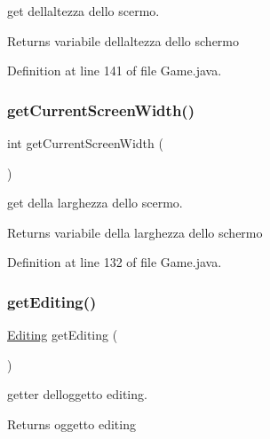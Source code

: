 get dell\textquotesingle{}altezza dello scermo. 

\begin{DoxyReturn}{Returns}
variabile dell\textquotesingle{}altezza dello schermo 
\end{DoxyReturn}


Definition at line 141 of file Game.\+java.

\mbox{\label{classprogetto_1_1_game_ad285af3491631b7569ae47a066925af7}} 
\subsubsection{\texorpdfstring{get\+Current\+Screen\+Width()}{getCurrentScreenWidth()}}
{\footnotesize\ttfamily int get\+Current\+Screen\+Width (\begin{DoxyParamCaption}{ }\end{DoxyParamCaption})}



get della larghezza dello scermo. 

\begin{DoxyReturn}{Returns}
variabile della larghezza dello schermo 
\end{DoxyReturn}


Definition at line 132 of file Game.\+java.

\mbox{\label{classprogetto_1_1_game_a0f1448e932e53b14606a448017e76c6c}} 
\subsubsection{\texorpdfstring{get\+Editing()}{getEditing()}}
{\footnotesize\ttfamily \hyperlink{classscenes_1_1_editing}{Editing} get\+Editing (\begin{DoxyParamCaption}{ }\end{DoxyParamCaption})}



getter dell\textquotesingle{}oggetto editing. 

\begin{DoxyReturn}{Returns}
oggetto editing 
\end{DoxyReturn}


